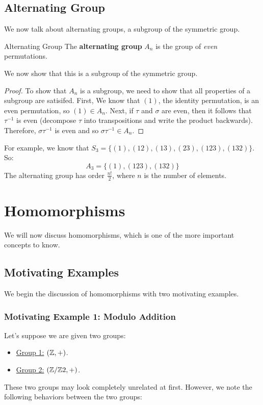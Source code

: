 \documentclass[letterpaper]{article}
\begin{document}
\subsection{Alternating Group}
We now talk about alternating groups, a subgroup of the symmetric group. 
\begin{definition}{Alternating Group}
    The \textbf{alternating group} $A_n$ is the group of \emph{even} permutations. 
\end{definition}
We now show that this is a subgroup of the symmetric group. 
\begin{mdframed}
    \begin{proof}
        To show that $A_n$ is a subgroup, we need to show that all properties of a subgroup are satisifed. First, We know that $(1)$, the identity permutation, is an even permutation, so $(1) \in A_n$. Next, if $\tau$ and $\sigma$ are even, then it follows that $\tau^{-1}$ is even (decompose $\tau$ into transpositions and write the product backwards). Therefore, $\sigma\tau^{-1}$ is even and so $\sigma\tau^{-1} \in A_n$. 
    \end{proof}
\end{mdframed}

For example, we know that $S_3 = \{(1), (12), (13), (23), (123), (132)\}$. So: 
\[A_3 = \{(1), (123), (132)\}\]
The alternating group has order $\frac{n!}{2}$, where $n$ is the number of elements.








\newpage 
\section{Homomorphisms}
We will now discuss homomorphisms, which is one of the more important concepts to know.  

\subsection{Motivating Examples}
We begin the discussion of homomorphisms with two motivating examples.

\subsubsection{Motivating Example 1: Modulo Addition}
Let's suppose we are given two groups: 
\begin{itemize}
    \item \underline{Group 1:} $(\mathbb{Z}, +)$. 
    \item \underline{Group 2:} $(\mathbb{Z} / \mathbb{Z} 2, +)$.
\end{itemize}
These two groups may look completely unrelated at first. However, we note the following behaviors between the two groups:
\end{document}
